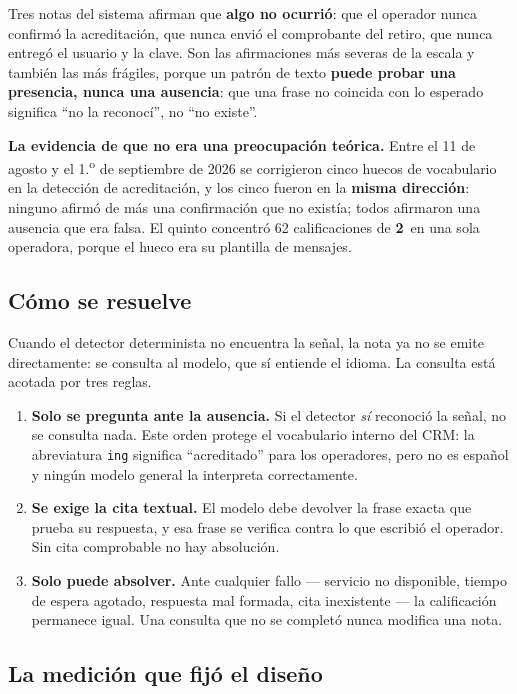\documentclass[11pt,a4paper]{article}
\newcommand{\cod}[1]{\texttt{\small #1}}
\newcommand{\est}[1]{\textbf{#1}\,\raisebox{0.5pt}{$\star$}}
\begin{document}
Tres notas del sistema afirman que \textbf{algo no ocurrió}: que el operador nunca confirmó
la acreditación, que nunca envió el comprobante del retiro, que nunca entregó el usuario y
la clave. Son las afirmaciones más severas de la escala y también las más frágiles, porque
un patrón de texto \textbf{puede probar una presencia, nunca una ausencia}: que una frase no
coincida con lo esperado significa ``no la reconocí'', no ``no existe''.

\begin{nota}
\textbf{La evidencia de que no era una preocupación teórica.} Entre el 11 de agosto y el
1.\textsuperscript{o} de septiembre de 2026 se corrigieron cinco huecos de vocabulario en la
detección de acreditación, y los cinco fueron en la \textbf{misma dirección}: ninguno afirmó
de más una confirmación que no existía; todos afirmaron una ausencia que era falsa. El
quinto concentró 62 calificaciones de \est{2} en una sola operadora, porque el hueco era su
plantilla de mensajes.
\end{nota}

\subsection{Cómo se resuelve}

Cuando el detector determinista no encuentra la señal, la nota ya no se emite directamente:
se consulta al modelo, que sí entiende el idioma. La consulta está acotada por tres reglas.

\begin{enumerate}
\item \textbf{Solo se pregunta ante la ausencia.} Si el detector \emph{sí} reconoció la
señal, no se consulta nada. Este orden protege el vocabulario interno del CRM: la abreviatura
\cod{ing} significa ``acreditado'' para los operadores, pero no es español y ningún modelo
general la interpreta correctamente.
\item \textbf{Se exige la cita textual.} El modelo debe devolver la frase exacta que prueba
su respuesta, y esa frase se verifica contra lo que escribió el operador. Sin cita
comprobable no hay absolución.
\item \textbf{Solo puede absolver.} Ante cualquier fallo --- servicio no disponible, tiempo
de espera agotado, respuesta mal formada, cita inexistente --- la calificación permanece
igual. Una consulta que no se completó nunca modifica una nota.
\end{enumerate}

\subsection{La medición que fijó el diseño}
\end{document}
